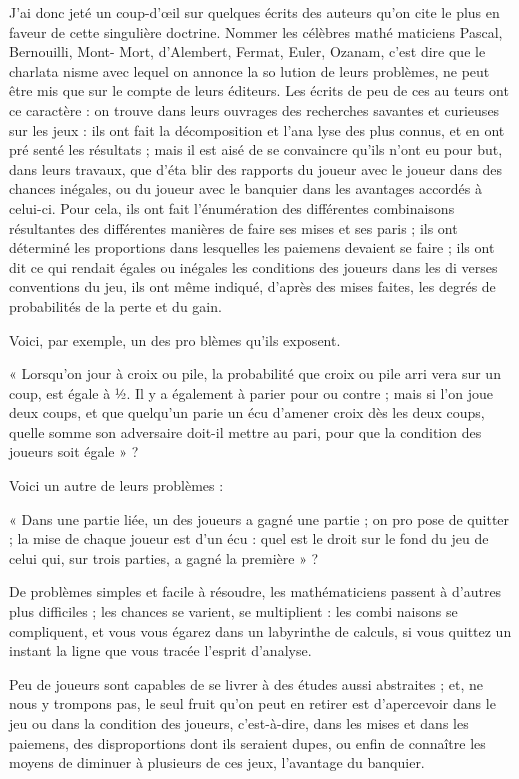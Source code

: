 J'ai donc jeté un coup-d'œil sur
quelques écrits des auteurs qu'on cite
le plus en faveur de cette singulière
doctrine. Nommer les célèbres mathé%
maticiens Pascal, Bernouilli, Mont-%
Mort, d'Alembert, Fermat, Euler,
Ozanam, c'est dire que le charlata%
nisme avec lequel on annonce la so%
lution de leurs problèmes, ne peut
être mis que sur le compte de leurs
éditeurs. Les écrits de peu de ces au%
teurs ont ce caractère : on trouve
dans leurs ouvrages des recherches
savantes et curieuses sur les jeux :
ils ont fait la décomposition et l'ana%
lyse des plus connus, et en ont pré%
senté les résultats ; mais il est aisé de
se convaincre qu'ils n'ont eu pour
but, dans leurs travaux, que d'éta%
blir des rapports du joueur avec le
joueur dans des chances inégales, ou
du joueur avec le banquier dans les
avantages accordés à celui-ci. Pour
cela, ils ont fait l'énumération des
différentes combinaisons résultantes
des différentes manières de faire ses
mises et ses paris ; ils ont déterminé
les proportions dans lesquelles les
paiemens devaient se faire ; ils ont dit
ce qui rendait égales ou inégales les
conditions des joueurs dans les di%
verses conventions du jeu, ils ont
même indiqué, d'après des mises
faites, les degrés de probabilités de la
perte et du gain.

Voici, par exemple, un des pro%
blèmes qu'ils exposent.

« Lorsqu'on jour à croix ou pile,
la probabilité que croix ou pile arri%
vera sur un coup, est égale à ½. Il y a
également à parier pour ou contre ;
mais si l'on joue deux coups, et que
quelqu'un parie un écu d'amener
croix dès les deux coups, quelle somme
son adversaire doit-il mettre au pari,
pour que la condition des joueurs soit
égale » ?

Voici un autre de leurs problèmes :

« Dans une partie liée, un des
joueurs a gagné une partie ; on pro%
pose de quitter ; la mise de chaque
joueur est d'un écu : quel est le droit
sur le fond du jeu de celui qui, sur
trois parties, a gagné la première » ?

De problèmes simples et facile à
résoudre, les mathématiciens passent
à d'autres plus difficiles ; les chances
se varient, se multiplient : les combi%
naisons se compliquent, et vous vous
égarez dans un labyrinthe de calculs,
si vous quittez un instant la ligne que
vous tracée l'esprit d'analyse.

Peu de joueurs sont capables de se
livrer à des études aussi abstraites ; et,
ne nous y trompons pas, le seul fruit
qu'on peut en retirer est d'apercevoir
dans le jeu ou dans la condition des
joueurs, c'est-à-dire, dans les mises et
dans les paiemens, des disproportions
dont ils seraient dupes, ou enfin de
connaître les moyens de diminuer à
plusieurs de ces jeux, l'avantage du
banquier.

